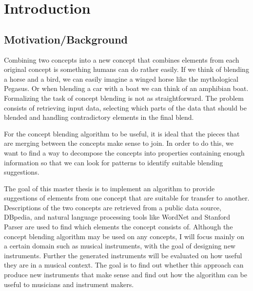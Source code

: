 
\chapter{Introduction} %

\label{Chapter1} %


\newcommand{\keyword}[1]{\textbf{#1}}
\newcommand{\tabhead}[1]{\textbf{#1}}
\newcommand{\code}[1]{\texttt{#1}}
\newcommand{\file}[1]{\texttt{\bfseries#1}}
\newcommand{\option}[1]{\texttt{\itshape#1}}


\section{Motivation/Background}
Combining two concepts into a new concept that combines elements from each original concept is something humans can do rather easily. If we think of blending a horse and a bird, we can easily imagine a winged horse like the mythological Pegasus. Or when blending a car with a boat we can think of an amphibian boat. Formalizing the task of concept blending is not as straightforward. The problem consists of retrieving input data, selecting which parts of the data that should be blended and handling contradictory elements in the final blend.

For the concept blending algorithm to be useful, it is ideal that the pieces that are merging between the concepts make sense to join. In order to do this, we want to find a way to decompose the concepts into properties containing enough information so that we can look for patterns to identify suitable blending suggestions. %

The goal of this master thesis is to implement an algorithm to provide suggestions of elements from one concept that are suitable for transfer to another. Descriptions of the two concepts are retrieved from a public data source, DBpedia, and natural language processing tools like WordNet and Stanford Parser are used to find which elements the concept consists of. Although the concept blending algorithm may be used on any concepts, I will focus mainly on a certain domain such as musical instruments, with the goal of designing new instruments. Further the generated instruments will be evaluated on how useful they are in a musical context. The goal is to find out whether this approach can produce new instruments that make sense and find out how the algorithm can be useful to musicians and instrument makers.

